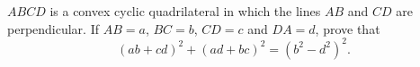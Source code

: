 $ABCD$ is a convex cyclic quadrilateral in which the lines $AB$ and $CD$ are perpendicular. If $AB=a$, $BC=b$, $CD=c$ and $DA=d$, prove that
\[
(ab+cd)^2+(ad+bc)^2=\left(b^2-d^2\right)^2 .
\]
